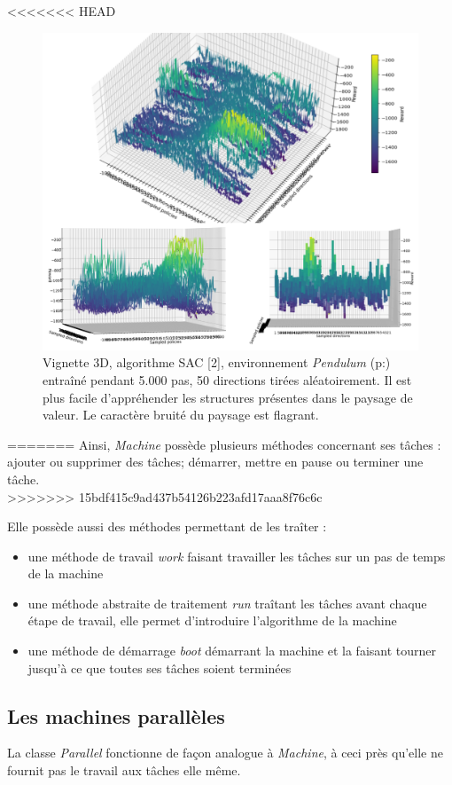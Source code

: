 \documentclass[12pt]{article}
\begin{document}
<<<<<<< HEAD
\begin{figure}[htp]
    \centering
    \includegraphics[width=15cm]{Images/vignette_3D}
    \caption{Vignette 3D, algorithme SAC [2], environnement \emph{Pendulum} (p:\pageref{second}) entraîné pendant 5.000 pas, 50 directions tirées aléatoirement. Il est plus facile d'appréhender les structures présentes dans le paysage de valeur. Le caractère bruité du paysage est flagrant.}
    \label{fig:vignette3D}
\end{figure}
=======
Ainsi, \emph{Machine} possède plusieurs méthodes concernant ses tâches : ajouter ou supprimer des tâches; démarrer, mettre en pause ou terminer une tâche. \\
>>>>>>> 15bdf415c9ad437b54126b223afd17aaa8f76c6c

Elle possède aussi des méthodes permettant de les traîter :
\begin{itemize}
	\item une méthode de travail \emph{work} faisant travailler les tâches sur un pas de temps de la machine
	\item une méthode abstraite de traitement \emph{run} traîtant les tâches avant chaque étape de travail, elle permet d'introduire l'algorithme de la machine
	\item une méthode de démarrage \emph{boot} démarrant la machine et la faisant tourner jusqu'à ce que toutes ses tâches soient terminées
\end{itemize}

\subsection{Les machines parallèles}
La classe \emph{Parallel} fonctionne de façon analogue à \emph{Machine}, à ceci près qu'elle ne fournit pas le travail aux tâches elle même. \\
\end{document}
